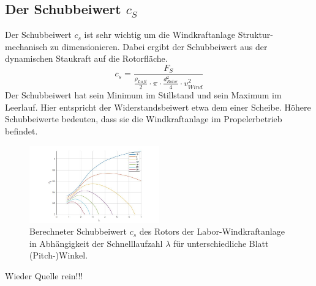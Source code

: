 \subsection{Der Schubbeiwert \texorpdfstring{$c_S$}{}}
Der Schubbeiwert $c_{s}$ ist sehr wichtig um die Windkraftanlage Struktur-mechanisch zu dimensionieren.  Dabei ergibt der Schubbeiwert aus der dynamischen Staukraft auf die Rotorfläche.
\begin{equation}
  c_{s}= \frac{F_{S}}{\frac{\rho_{Luft}}{2}\cdot \pi \cdot \frac{d^2_{Rotor}}{4} \cdot v^2_{Wind}}
    \label{eq:Schubbeiwert_cs}
\end{equation}
Der Schubbeiwert hat sein Minimum im Stillstand und sein Maximum im Leerlauf. Hier entspricht der Widerstandsbeiwert etwa dem einer Scheibe. Höhere Schubbeiwerte bedeuten, dass sie die Windkraftanlage im Propelerbetrieb befindet.
\begin{figure}[!ht]
    \centering
    \includegraphics[width=0.5\textwidth]{Abbildungen/cszulambda.jpg}
    \caption{Berechneter Schubbeiwert $c_{s}$ des Rotors der Labor-Windkraftanlage in Abhängigkeit der Schnelllaufzahl $\lambda$ für unterschiedliche Blatt (Pitch-)Winkel.}
    \label{fig:cszulambda}
\end{figure}
Wieder Quelle rein!!!
